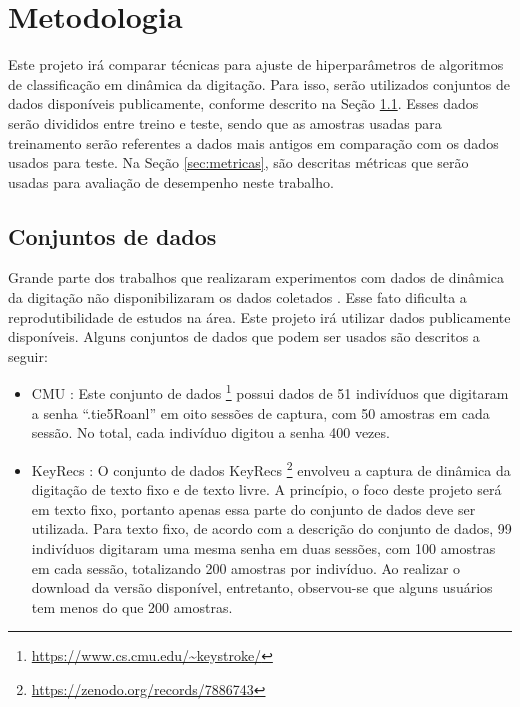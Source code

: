 \section{Metodologia}
\label{sec:metodologia}

Este projeto irá comparar técnicas para ajuste de hiperparâmetros de algoritmos de classificação em dinâmica da digitação. Para isso, serão utilizados conjuntos de dados disponíveis publicamente, conforme descrito na Seção \ref{sec:datasets}. Esses dados serão divididos entre treino e teste, sendo que as amostras usadas para treinamento serão referentes a dados mais antigos em comparação com os dados usados para teste. Na Seção \ref{sec:metricas}, são descritas métricas que serão usadas para avaliação de desempenho neste trabalho.


\subsection{Conjuntos de dados}
\label{sec:datasets}

Grande parte dos trabalhos que realizaram experimentos com dados de dinâmica da digitação não disponibilizaram os dados coletados \cite{Roy2022systematic}. Esse fato dificulta a reprodutibilidade de estudos na área. Este projeto irá utilizar dados publicamente disponíveis. Alguns conjuntos de dados que podem ser usados são descritos a seguir:

\begin{itemize}
    \item CMU \cite{Killourhy2009}: Este conjunto de dados \footnote{\url{https://www.cs.cmu.edu/~keystroke/}} possui dados de 51 indivíduos que digitaram a senha ``.tie5Roanl'' em oito sessões de captura, com 50 amostras em cada sessão. No total, cada indivíduo digitou a senha 400 vezes.
    \item KeyRecs \cite{Dias2023keyrecs}: O conjunto de dados KeyRecs \footnote{\url{https://zenodo.org/records/7886743}} envolveu a captura de dinâmica da digitação de texto fixo e de texto livre. A princípio, o foco deste projeto será em texto fixo, portanto apenas essa parte do conjunto de dados deve ser utilizada. Para texto fixo, de acordo com a descrição do conjunto de dados, 99 indivíduos digitaram uma mesma senha em duas sessões, com 100 amostras em cada sessão, totalizando 200 amostras por indivíduo. Ao realizar o download da versão disponível, entretanto, observou-se que alguns usuários tem menos do que 200 amostras.
\end{itemize}

